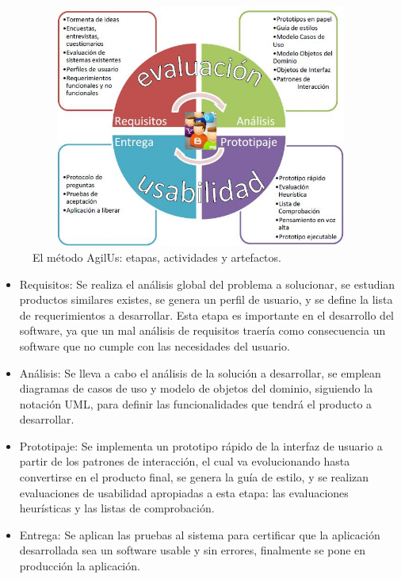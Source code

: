 \begin{figure}[H]
\begin{center}
	\includegraphics[width=13cm,height=8cm]{img/agilus.jpg}
\end{center}
\caption{El método AgilUs: etapas, actividades y artefactos.}
\label{fig:Agilus}
\end{figure}



\begin{itemize}

    \item Requisitos: Se realiza el análisis global del problema a solucionar, se estudian productos similares existes, se genera un perfil de usuario, y se define la lista de requerimientos a desarrollar. Esta etapa es importante en el desarrollo del software, ya que un mal análisis de requisitos traería como consecuencia un software que no cumple con las necesidades del usuario.

    \item Análisis: Se lleva a cabo el análisis de la solución a desarrollar, se emplean diagramas de casos de uso y modelo de objetos del dominio, siguiendo la notación UML, para definir las funcionalidades que tendrá el producto a desarrollar.

    \item Prototipaje: Se implementa un prototipo rápido de la interfaz de usuario a partir de los patrones de interacción, el cual va evolucionando hasta convertirse en el producto final, se genera la guía de estilo, y se realizan evaluaciones de usabilidad apropiadas a esta etapa: las evaluaciones heurísticas y las listas de comprobación.

    \item Entrega: Se aplican las pruebas al sistema para certificar que la aplicación desarrollada sea un software usable y sin errores, finalmente se pone en producción la aplicación.

\end{itemize}

